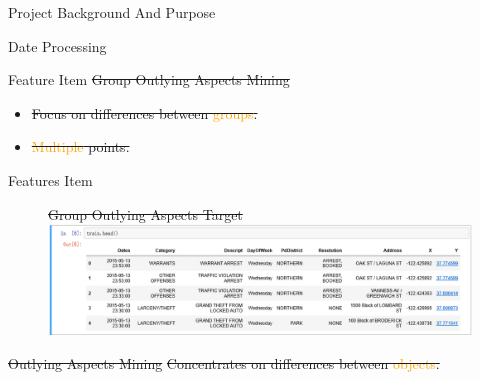 \documentclass[
 size=14pt,
 paper=smartboard,  %
 mode=present, 		%
 display=slides, 	%
 style=tuliplab,  	%
 pauseslide,
 fleqn,leqno]{powerdot}
\providecommand{\DIFdeltex}[1]{{\protect\color{red}\sout{#1}}}                      %
\providecommand{\DIFaddbegin}{} %
\providecommand{\DIFaddend}{} %
\providecommand{\DIFdelbegin}{} %
\providecommand{\DIFdelend}{} %
\providecommand{\DIFdelFL}[1]{\DIFdel{#1}} %
\providecommand{\DIFaddbeginFL}{} %
\providecommand{\DIFaddendFL}{} %
\providecommand{\DIFdelbeginFL}{} %
\providecommand{\DIFdelendFL}{} %
\providecommand{\DIFdel}[1]{\texorpdfstring{\DIFdeltex{#1}}{}} %
\newcommand{\DIFscaledelfig}{0.5}
\newlength{\DIFdelgraphicswidth} %
\newlength{\DIFdelgraphicsheight} %
\newcommand{\DIFaddincludegraphics}[2][]{{\color{blue}\fbox{\DIFOincludegraphics[#1]{#2}}}} %
\newcommand{\DIFdelincludegraphics}[2][]{%
\sbox{\DIFdelgraphicsbox}{\DIFOincludegraphics[#1]{#2}}%
\settoboxwidth{\DIFdelgraphicswidth}{\DIFdelgraphicsbox} %
\settoboxtotalheight{\DIFdelgraphicsheight}{\DIFdelgraphicsbox} %
\scalebox{\DIFscaledelfig}{%
\parbox[b]{\DIFdelgraphicswidth}{\usebox{\DIFdelgraphicsbox}\\[-\baselineskip] \rule{\DIFdelgraphicswidth}{0em}}\llap{\resizebox{\DIFdelgraphicswidth}{\DIFdelgraphicsheight}{%
\setlength{\unitlength}{\DIFdelgraphicswidth}%
\begin{picture}(1,1)%
\thicklines\linethickness{2pt} %
{\color[rgb]{1,0,0}\put(0,0){\framebox(1,1){}}}%
{\color[rgb]{1,0,0}\put(0,0){\line( 1,1){1}}}%
{\color[rgb]{1,0,0}\put(0,1){\line(1,-1){1}}}%
\end{picture}%
}\hspace*{3pt}}} %
} %
\DeclareRobustCommand{\DIFaddbegin}{\DIFOaddbegin \let\includegraphics\DIFaddincludegraphics} %
\DeclareRobustCommand{\DIFaddend}{\DIFOaddend \let\includegraphics\DIFOincludegraphics} %
\DeclareRobustCommand{\DIFdelbegin}{\DIFOdelbegin \let\includegraphics\DIFdelincludegraphics} %
\DeclareRobustCommand{\DIFdelend}{\DIFOaddend \let\includegraphics\DIFOincludegraphics} %
\DeclareRobustCommand{\DIFaddbeginFL}{\DIFOaddbeginFL \let\includegraphics\DIFaddincludegraphics} %
\DeclareRobustCommand{\DIFaddendFL}{\DIFOaddendFL \let\includegraphics\DIFOincludegraphics} %
\DeclareRobustCommand{\DIFdelbeginFL}{\DIFOdelbeginFL \let\includegraphics\DIFdelincludegraphics} %
\DeclareRobustCommand{\DIFdelendFL}{\DIFOaddendFL \let\includegraphics\DIFOincludegraphics} %
\begin{document}
\begin{slide}
\begin{slide}{Project Background And Purpose}
\begin{slide}{Date Processing}
\begin{slide}{Feature Item}
\DIFdelbegin %
\DIFdel{Group Outlying Aspects Mining
}%
\begin{itemize}%
\item%
\DIFdel{Focus on differences between \textcolor{orange}{groups}.
}%

\item%
\DIFdel{\textcolor{orange}{Multiple} points.
}%

\end{itemize}%
\DIFdelend %
\DIFaddbegin \begin{slide}{Features Item}
  \DIFaddend \begin{figure}
    \centering
    \DIFdelbeginFL %
{%
\DIFdelFL{Group Outlying Aspects Target}}%
\DIFdelendFL \DIFaddbeginFL \includegraphics[width=1\textwidth]{kaggle/2.eps}
  \DIFaddendFL \end{figure}
  \DIFdelbegin %
\DIFdel{Outlying Aspects Mining
}%
\DIFdel{Concentrates on differences between \textcolor{orange}{objects}.
}\DIFdelend 


\end{slide}
\end{slide}
\end{slide}
\end{slide}
\end{slide}
\end{document}
